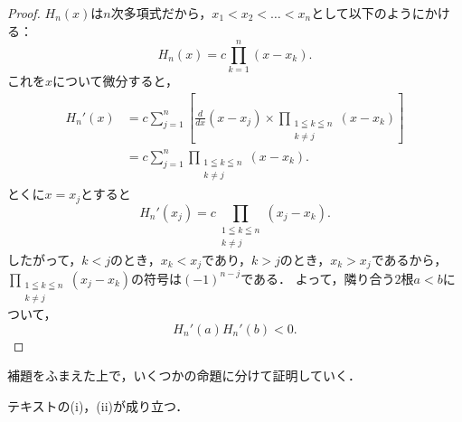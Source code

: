 \documentclass[a4paper,10pt,fleqn]{ltjsarticle}
\begin{document}
\begin{proof}
    $H_n (x)$は$n$次多項式だから，$x_1 < x_2 < \dots <x_n$として以下のようにかける：
    \[
        H_n (x) = c \prod_{k=1}^{n} (x-x_k).
    \]
    これを$x$について微分すると，
    \begin{align*}
        H_n '(x) & = c \sum_{j=1}^{n} \left[ \frac{d}{dx} (x-x_j) \times  \prod_{\substack{1 \leqq k \leqq n \\ k \ne j}} (x-x_k) \right] \\
                 & = c \sum_{j=1}^{n} \prod_{\substack{1 \leqq k \leqq n                                     \\ k \ne j}} (x-x_k).
    \end{align*}
    とくに$x = x_j$とすると
    \[
        H_n '(x_j) = c \prod_{\substack{1 \leqq k \leqq n \\ k \ne j}} (x_j-x_k).
    \]
    したがって，$k <j$のとき，$x_k < x_j$であり，$k > j$のとき，$x_k > x_j$であるから，
    $\prod_{\substack{1 \leqq k \leqq n \\ k \ne j}} (x_j-x_k)$の符号は$(-1)^{n-j}$である．
    よって，隣り合う$2$根$a < b$について，
    \[
        H_n '(a) H_n ' (b)<0.
    \]
\end{proof}

補題をふまえた上で，いくつかの命題に分けて証明していく．


テキストの(i)，(ii)が成り立つ．
\end{document}
